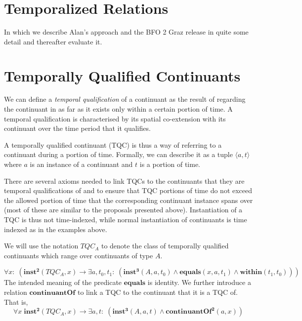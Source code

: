 \documentclass[10pt]{bmc_article}
\newcommand{\mirel}[1]{\ensuremath{\mathrm{\mathbf{#1}}}}
\newcommand{\mclass}[1]{\ensuremath{\mathit{#1}}}
\newcommand{\mrel}[2]{\mirel{#1^#2}}
\newcommand{\mrelb}[1]{\mrel{#1}{2}}
\newcommand{\mrelt}[1]{\mrel{#1}{3}}
\newcommand{\pair}[2]{\ensuremath{\langle #1,#2\rangle}}
\newcommand{\TQC}[1]{\ensuremath{TQC_{\mclass{#1}}}}
\newenvironment{bmcformat}{\baselineskip20pt\sloppy\setboolean{publ}{false}}{\baselineskip20pt\sloppy}
\begin{document}
\begin{bmcformat}
\section*{Temporalized Relations}

In which we describe Alan's approach and the BFO 2 Graz release in quite some detail and thereafter evaluate it. 


\section*{Temporally Qualified Continuants}

We can define a \emph{temporal qualification} of a
continuant as the result of regarding the continuant in as far as it exists only
within a certain portion of time. A temporal qualification is 
characterised by its spatial co-extension with its continuant over the time
period that it qualifies.

A temporally qualified continuant (TQC) is thus a way of referring to a continuant
during a portion of time. Formally, we can describe it as a tuple \pair{a}{t}
where $a$ is an instance
of a continuant and $t$ is a portion of time. 

There are several axioms needed to link TQCs to the continuants that they are
temporal qualifications of and to ensure that TQC portions of time do not exceed the
allowed portion of time that the corresponding continuant instance spans over
(most of these are similar to the proposals presented above).
Instantiation of a TQC is thus not time-indexed, while normal instantiation of
continuants is time indexed as in the examples above. 


We will use the notation \TQC{A} to denote the class of temporally qualified
continuants which range over continuants of type \mclass{A}.

\begin{equation}
\forall x:\; (\mrelb{inst}(\TQC{A},x) \rightarrow \exists a,t_0,t_1:\;(
\mrelt{inst}(\mclass{A},a,t_0) \wedge \mirel{equals}(x,a,t_1) \wedge
\mirel{within}(t_1,t_0)))
\end{equation}
The intended meaning of the predicate \mirel{equals} is identity.  
We further introduce a relation \mirel{continuantOf} to link a TQC to the continuant
that it is a TQC of. That is, 
\begin{equation}
\forall x\; \mrelb{inst}(\TQC{A},x) \rightarrow \exists a,t:\;(
\mrelt{inst}(\mclass{A}, a,t) \wedge \mrelb{continuantOf}(a,x))
\end{equation}


\end{bmcformat}
\end{document}

